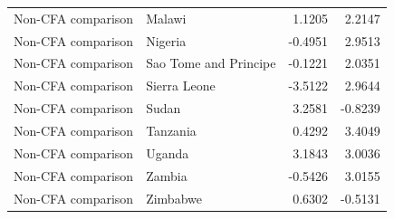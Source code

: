 \begin{table}
\begin{tabular}[t]{llrr}
Non-CFA comparison & Malawi & 1.1205 & 2.2147\\
Non-CFA comparison & Nigeria & -0.4951 & 2.9513\\
Non-CFA comparison & Sao Tome and Principe & -0.1221 & 2.0351\\
Non-CFA comparison & Sierra Leone & -3.5122 & 2.9644\\
\addlinespace
Non-CFA comparison & Sudan & 3.2581 & -0.8239\\
Non-CFA comparison & Tanzania & 0.4292 & 3.4049\\
Non-CFA comparison & Uganda & 3.1843 & 3.0036\\
Non-CFA comparison & Zambia & -0.5426 & 3.0155\\
Non-CFA comparison & Zimbabwe & 0.6302 & -0.5131\\
\bottomrule
\end{tabular}
\end{table}